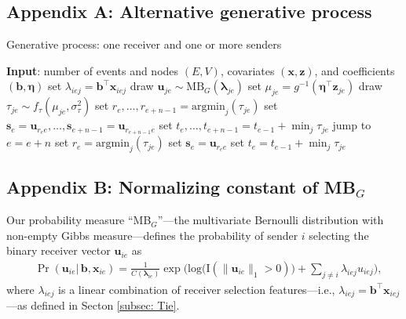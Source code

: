 \documentclass[ba]{imsart}
\numberwithin{equation}{section}
\theoremstyle{plain}
\begin{document}
	\subsection*{Appendix A: Alternative generative process} \label{appendix:alternativeGP}
	\begin{algorithm}[H]
		\SetAlgoLined
		\caption{Generative process: one receiver and one or more senders}
		\begin{algorithmic}
			\STATE \textbf{Input}: number of events and nodes $(E, V)$, covariates $(\boldsymbol{x}, \boldsymbol{z})$, and coefficients $(\boldsymbol{b}, \boldsymbol{\eta})$
			\vskip 0.1in				
			\STATE	set $\lambda_{iej} = {\boldsymbol{b}}^{\top}\boldsymbol{x}_{iej}$
			\ENDFOR
			\STATE	draw $\boldsymbol{u}_{je}  \sim
			\mbox{MB}_G(\boldsymbol{\lambda}_{je})$
			\STATE		set $\mu_{je} = g^{-1}(\boldsymbol{\eta}^\top \boldsymbol{z}_{je})$
			\STATE		draw $\tau_{je} \sim f_\tau(\mu_{je}, \sigma_\tau^2)$
			\ENDFOR
			\STATE	set ${r}_e,\ldots, r_{e+n-1}=\mbox{argmin}_{j}(\tau_{je})$
			\STATE	set $\boldsymbol{s}_e=\boldsymbol{u}_{r_e e},\ldots,\boldsymbol{s}_{e+n-1}=\boldsymbol{u}_{r_{e+n-1} e}$
			\STATE	set $t_e, \ldots, t_{e+n-1}=t_{e-1} + \min_j\tau_{je}$
			\STATE		jump to $e = e+n$
			\ELSE
			\STATE	set ${r}_e = \mbox{argmin}_{j}(\tau_{je}) $
			\STATE	set $\boldsymbol{s}_e= \boldsymbol{u}_{r_e e}$
			\STATE	set $t_e =t_{e-1} + \min_j\tau_{je}$
			\ENDIF
			\ENDFOR
		\end{algorithmic}
		\label{alg:generative2}
	\end{algorithm}
	\subsection*{Appendix B: Normalizing constant of MB$_{G}$}\label{appendix: non-empty Gibbs measure}
	Our probability measure ``MB$_{G}$''---the multivariate Bernoulli distribution with non-empty Gibbs measure---defines the probability of sender $i$ selecting the binary receiver vector $\boldsymbol{u}_{ie}$ as
	\begin{equation*} 
		\begin{aligned}
			& \Pr(\boldsymbol{u}_{ie}|\,\boldsymbol{b}, \boldsymbol{x}_{ie}) = \frac{1}{C(\boldsymbol{\lambda}_{ie})}\exp\Big(\mbox{log}\big(\text{I}(\lVert \boldsymbol{u}_{ie} \rVert_1 > 0)\big) + \sum_{j \neq i} \lambda_{iej}u_{iej} \Big),
		\end{aligned}
	\end{equation*}
	where $\lambda_{iej}$ is a linear combination of receiver selection features---i.e., $\lambda_{iej} = {\boldsymbol{b}}^{\top}\boldsymbol{x}_{iej}$---as defined in Secton \ref{subsec: Tie}.
	
\end{document}
